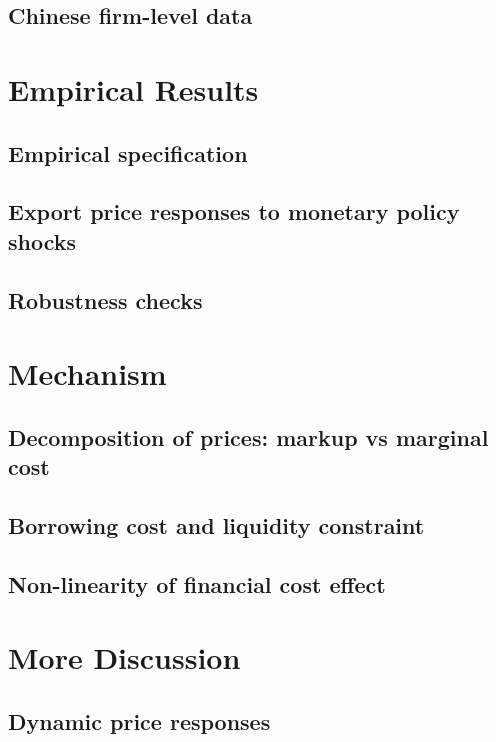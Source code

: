 \subsection{Chinese firm-level data}

\section{Empirical Results}

\subsection{Empirical specification}

\subsection{Export price responses to monetary policy shocks}

\subsection{Robustness checks}

\section{Mechanism}

\subsection{Decomposition of prices: markup vs marginal cost}

\subsection{Borrowing cost and liquidity constraint}

\subsection{Non-linearity of financial cost effect}

\section{More Discussion}

\subsection{Dynamic price responses}

